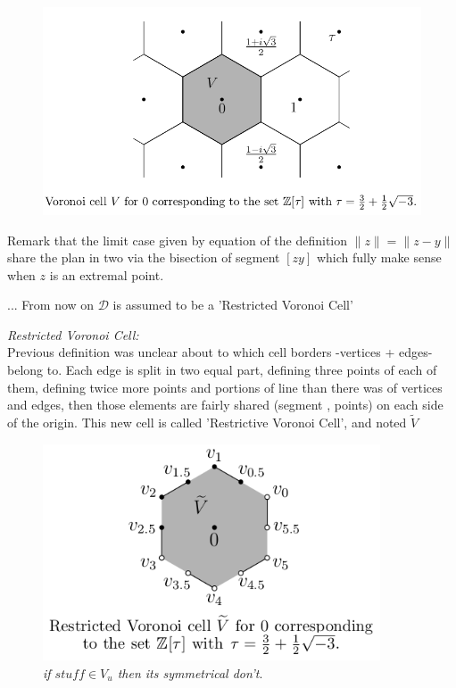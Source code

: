\begin{itemize}
        \begin{figure}[!h]
          \centering
          \includegraphics[width=15cm]{images/voronoi.png}
        \end{figure}
        Remark that the limit case given by equation of the definition
 		$ \|z\| = \|z-y\| $ share the plan in two via the bisection of 
 		segment $[zy]$ which fully make sense when $z$ is an extremal point.
        \newpage

        \raggedleft 
		... From now on $\mathcal{D}$ is assumed to be a 'Restricted Voronoi Cell' \\
		\raggedright		
	\begin{mydef} \textit{Restricted Voronoi Cell:}\\
        Previous definition was unclear about to which cell borders 
        -vertices + edges- belong to.
        Each edge is split in two equal part, defining three points of each of them,
        defining twice more points and portions of line than there was of vertices 
        and edges, then those elements are fairly shared (segment , points) 
        on each side of the origin.         
        This new cell is called 'Restrictive Voronoi Cell', and noted $\tilde{V}$
        \begin{figure}[!h]
          \centering
          \includegraphics[width=10cm]{images/voronoi_restricted.png}
          \caption{     \textit{if $stuff \in V_u$ then its symmetrical don't}.}
        \end{figure}
    \end{mydef}
\raggedleft 


\end{itemize}
